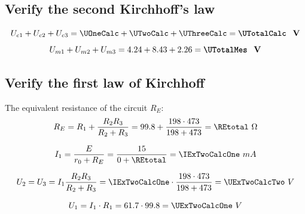 \documentclass{article}
\begin{document}
		\subsection{Verify the second Kirchhoff's law}

			\[U_{c1} + U_{c2} + U_{c3} = \UOneCalc + \UTwoCalc + \UThreeCalc = \textbf{\UTotalCalc \ V}\]
			\[U_{m1} + U_{m2} + U_{m3} = \UExOneOne + \UExOneTwo + \UExOneThree = \textbf{\UTotalMes \ V}\]

		\subsection{}

		\subsection{Verify the first law of Kirchhoff}
			
			The equivalent resistance of the circuit $R_E$:
			\[
				R_E = R_1 + \frac{R_2 R_3}{R_2 + R_3} = \ROne + \frac{\RTwo \cdot \RMax}{\RTwo + \RMax} = \REtotal \ \Omega
			\]


			\[
				I_1 = \frac{E}{r_0 + R_E} = \frac{15}{0 + \REtotal} = \IExTwoCalcOne \ mA
			\]


			\[
				U_2 = U_3 = I_1 \frac{R_2 R_3}{R_2 + R_3} =
					\IExTwoCalcOne \cdot \frac{\RTwo \cdot \RMax}{\RTwo + \RMax} =
					\UExTwoCalcTwo \ V
			\]


			\[
				U_1 = I_1 \cdot R_1 = \IExTwoOne \cdot \ROne = \UExTwoCalcOne \ V
			\]

\end{document}
